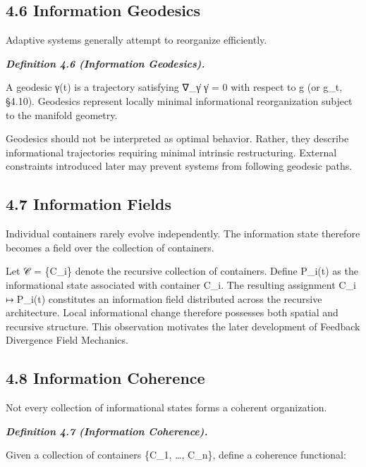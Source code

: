 \documentclass[
]{article}
\begin{document}
\hypertarget{information-geodesics}{%
\subsection{4.6 Information Geodesics}\label{information-geodesics}}

Adaptive systems generally attempt to reorganize efficiently.

\emph{\textbf{Definition 4.6 (Information Geodesics).}}

A geodesic γ(t) is a trajectory satisfying ∇\_γ̇ γ̇ = 0 with respect to g
(or g\_t, §4.10). Geodesics represent locally minimal informational
reorganization subject to the manifold geometry.

Geodesics should not be interpreted as optimal behavior. Rather, they
describe informational trajectories requiring minimal intrinsic
restructuring. External constraints introduced later may prevent systems
from following geodesic paths.

\hypertarget{information-fields}{%
\subsection{4.7 Information Fields}\label{information-fields}}

Individual containers rarely evolve independently. The information state
therefore becomes a field over the collection of containers.

Let 𝒞 = \{C\_i\} denote the recursive collection of containers. Define
P\_i(t) as the informational state associated with container C\_i. The
resulting assignment C\_i ↦ P\_i(t) constitutes an information field
distributed across the recursive architecture. Local informational
change therefore possesses both spatial and recursive structure. This
observation motivates the later development of Feedback Divergence Field
Mechanics.

\hypertarget{information-coherence}{%
\subsection{4.8 Information Coherence}\label{information-coherence}}

Not every collection of informational states forms a coherent
organization.

\emph{\textbf{Definition 4.7 (Information Coherence).}}

Given a collection of containers \{C\_1, \ldots, C\_n\}, define a
coherence functional:
\end{document}
